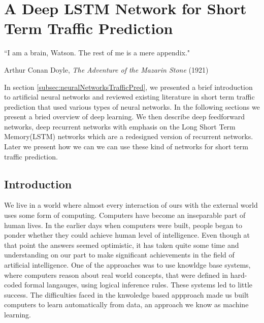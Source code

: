 
\chapter{A Deep LSTM Network for Short Term Traffic Prediction} %

\label{Chapter4} %


{``I am a brain, Watson. The rest of me is a mere appendix."}
\begin{flushright}
Arthur Conan Doyle, \textit{The Adventure of the Mazarin Stone} (1921)
\end{flushright}


In section \ref{subsec:neuralNetworksTrafficPred}, we presented a brief introduction to artificial
neural networks and reviewed existing literature in short term traffic prediction that used
various types of neural networks. In the following sections we present a bried overview of deep
learning. We then describe deep feedforward networks, deep recurrent networks with emphasis on
the Long Short Term Memory(LSTM) networks which are a redesigned version of recurrent networks.
Later we present how we can we can use these kind of networks for short term traffic prediction.

\section{Introduction}
We live in a world where almost every interaction of ours with the external world uses some
form of computing. Computers have become an inseparable part of human lives. In the earlier days
when computers were built, people began to ponder whether they could achieve human level
of intelligence. Even though at that point the answers seemed optimistic, it has taken quite
some time and understanding on our part to make significant achievements in the field of
artificial intelligence. One of the approaches was to use knowldge base systems, where computers
reason about real world concepts, that were defined in hard-coded formal langauges, using logical
inference rules. These systems led to little success. The difficulties faced in the knwoledge
based appproach made us built computers to learn automatically from data, an approach we know as
machine learning.

